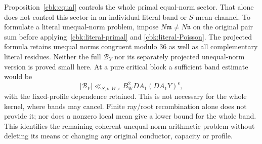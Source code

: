 Proposition~\ref{cbk:equal} controls the whole primal equal-norm
sector. That alone does not control this sector in an individual
literal band or $S$-mean channel. To formulate a literal unequal-norm
problem, impose $N\mathfrak m\ne N\mathfrak n$ on the original pair
sum before applying~\eqref{cbk:literal-primal} and
\eqref{cbk:literal-Poisson}. The projected formula retains unequal
norms congruent modulo $36$ as well as all complementary literal
residues. Neither the full $\mathcal B_Y$ nor its separately projected
unequal-norm version is proved small here. At a pure critical block a
sufficient band estimate would be
\[
 |\mathcal B_Y|\ll_{S,\nu,W,\epsilon}
                         B_W^2 D A_1(DA_1Y)^\epsilon,
\]
with the fixed-profile dependence retained. This is not necessary
for the whole kernel, where bands may cancel. Finite ray/root
recombination alone does not provide it; nor does a nonzero local
mean give a lower bound for the whole band. This identifies the
remaining coherent unequal-norm arithmetic problem without deleting
its means or changing any original conductor, capacity or profile.
